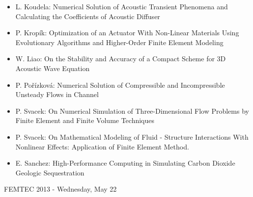 \documentclass[10pt]{article}%
\begin{document}
\begin{itemize}
\begin{itemize}
    \item {L. Koudela}: {Numerical Solution of Acoustic Transient Phenomena and Calculating the Coefficients of Acoustic Diffuser}
    \item {P. Kropík}: {Optimization of an Actuator With Non-Linear Materials Using Evolutionary Algorithms and Higher-Order Finite Element Modeling}
    \item {W. Liao}: {On the Stability and Accuracy of a Compact Scheme for 3D Acoustic Wave Equation}
    \item {P. Pořízková}: {Numerical Solution of Compressible and Incompressible Unsteady Flows in Channel}
	\item {P. Svacek}: {On Numerical Simulation of Three-Dimensional Flow Problems by Finite Element and Finite Volume Techniques}
	\item {P. Svacek}: {On Mathematical Modeling of Fluid - Structure Interactions With Nonlinear Effects: Application of Finite Element Method.}
    \item {E. Sanchez}: {High-Performance Computing in Simulating Carbon Dioxide Geologic Sequestration}
  \end{itemize}
   
\end{itemize}

\newpage

\centerline{\huge FEMTEC 2013 - Wednesday, May 22}
\vspace{4mm}
\end{document}
